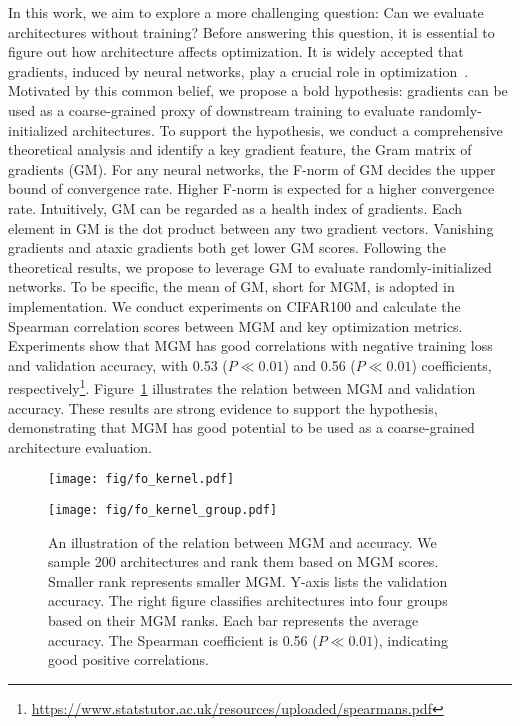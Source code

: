 In this work, we aim to explore a more challenging question: Can we evaluate architectures without training? 
Before answering this question, it is essential to figure out how architecture affects optimization. 
It is widely accepted that gradients, induced by neural networks, play a crucial role in optimization~\citep{DBLP:journals/tnn/BengioSF94,DBLP:journals/neco/HochreiterS97,DBLP:conf/icml/PascanuMB13}. Motivated by this common belief, we propose a bold hypothesis: gradients can be used as a coarse-grained proxy of downstream training to evaluate randomly-initialized architectures. To support the hypothesis, we conduct a comprehensive theoretical analysis and identify a key gradient feature, the Gram matrix of gradients (GM). For any neural networks, the F-norm of GM decides the upper bound of convergence rate. Higher F-norm is expected for a higher convergence rate.  Intuitively, GM can be regarded as a health index of gradients. Each element in GM is the dot product between any two gradient vectors. Vanishing gradients and ataxic gradients both get lower GM scores. Following the theoretical results, we propose to leverage GM  to evaluate randomly-initialized networks. To be specific, the mean of GM, short for MGM,  is adopted in implementation. We conduct experiments on CIFAR100 and calculate the Spearman correlation scores between MGM and key optimization metrics. Experiments show that MGM has good correlations with negative training loss and validation accuracy, with 0.53  ($P \ll 0.01 $) and 0.56  ($P \ll 0.01 $) coefficients, respectively\footnote{\url{https://www.statstutor.ac.uk/resources/uploaded/spearmans.pdf}}. Figure~\ref{fig:illu} illustrates the relation between MGM and validation accuracy. These results are strong evidence to support the hypothesis, demonstrating that MGM has good potential to be used as a coarse-grained architecture evaluation. 


\begin{figure}[t]
\centering
\begin{minipage}{.23\textwidth}
\centering
\texttt{[image: fig/fo\_kernel.pdf]}
\label{fig:prob1_6_2}
\end{minipage}
 \hfill
\begin{minipage}{0.23\textwidth}
\centering
\texttt{[image: fig/fo\_kernel\_group.pdf]}
\label{fig:prob1_6_1}
\end{minipage}
\caption{An illustration of the relation between MGM and accuracy. We sample 200 architectures and rank them based on MGM scores. Smaller rank represents smaller MGM. Y-axis lists the validation accuracy. The right figure classifies architectures into four groups based on their MGM ranks. Each bar represents the average accuracy. The Spearman coefficient is 0.56  ($P \ll 0.01 $), indicating good positive correlations.  }
\label{fig:illu}
\end{figure}








